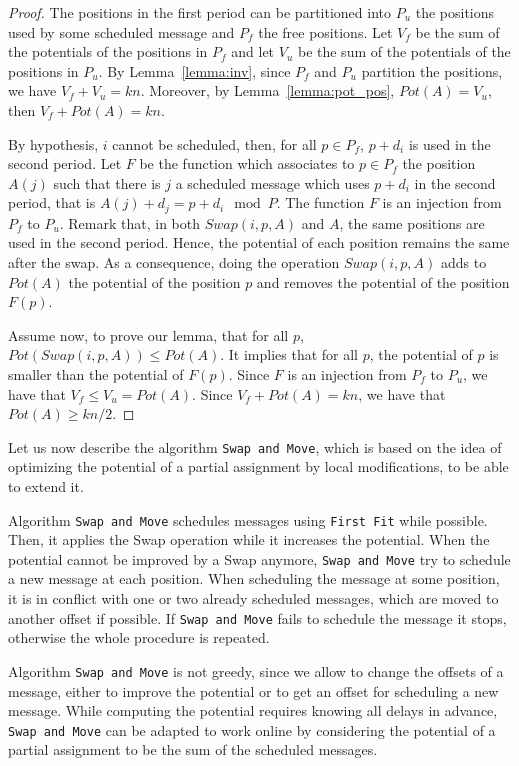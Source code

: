 \documentclass[a4paper,UKenglish,cleveref, autoref, thm-restate]{lipics-v2019}
\newcommand\firstfit{\texttt{First Fit}\xspace}
\newcommand\swapandmove{\texttt{Swap and Move}\xspace}
\begin{document}
\begin{proof}
The positions in the first period can be partitioned into $P_{u}$ the positions used by some scheduled message and $P_{f}$ the free positions.
Let $V_f$ be the sum of the potentials of the positions in $P_f$ and let $V_u$ be the sum of the potentials of the positions in $P_u$. By Lemma~\ref{lemma:inv}, since $P_f$ and $P_u$ partition the positions, we have $V_f + V_u = kn$. Moreover, by Lemma~\ref{lemma:pot_pos}, $Pot(A) = V_u$, then $V_f + Pot(A) = kn$.

By hypothesis, $i$ cannot be scheduled, then, for all $p \in P_{f}$, $p+d_i$ is used in the second period. Let $F$ be the function which associates to $p \in P_{f}$ the position $A(j)$ such that there is $j$ a scheduled message which uses $p+d_i$ in the second period, that is $A(j) + d_j = p + d_i \mod P$. The function $F$ is an injection from $P_{f}$ to $P_u$. Remark that, in both $Swap(i,p,A)$ and $A$, the same positions are used in the second period. Hence, the potential of each position remains the same after the swap. As a consequence, doing the operation $Swap(i,p,A)$ adds to $Pot(A)$ the potential of the position $p$ and removes the potential of the position $F(p)$. 

Assume now, to prove our lemma, that for all $p$, $Pot(Swap(i,p,A)) \leq Pot(A)$. It implies that for all $p$, the potential of $p$ is smaller than the potential of $F(p)$. Since $F$ is an injection from $P_f$ to $P_u$, we have that $V_f \leq V_u = Pot(A)$. Since $V_f + Pot(A) = kn$, we have that $Pot(A) \geq kn/2$.
\end{proof}


Let us now describe the algorithm \swapandmove, which is based on the idea of optimizing the potential of a partial assignment by local modifications, to be able to extend it.

Algorithm \swapandmove schedules messages using \firstfit while possible. Then, it applies the Swap operation while it increases the potential. When the potential cannot be improved by a Swap anymore, \swapandmove try to schedule a new message at each position. When scheduling the message at some position, it is in conflict with one or two already 
scheduled messages, which are moved to another offset if possible. If \swapandmove fails to schedule the message it stops, otherwise the whole procedure is repeated. 

Algorithm \swapandmove is not greedy, since we allow to change the offsets of a message,
either to improve the potential or to get an offset for scheduling a new message. While computing the potential requires knowing all delays in advance, \swapandmove can be adapted to work online by considering the potential of a partial assignment to be the sum of the scheduled messages.
\end{document}
